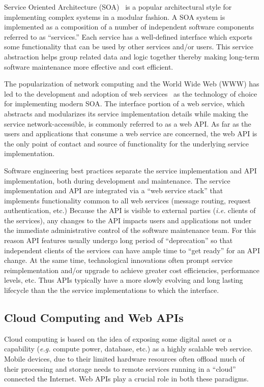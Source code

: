 Service Oriented Architecture (SOA)~\cite{XXX} is a popular architectural style for
implementing complex systems in a modular fashion. A SOA system
is implemented as a composition of a number of independent software components
referred to as ``services.'' Each service has a well-defined interface which
exports some functionality that can be used by other services and/or users.
This service abstraction helps group related data and logic together thereby
making long-term software maintenance more effective and cost efficient. 

The popularization of network computing and the World Wide Web (WWW) 
has led to the development and adoption of web services~\cite{XXXW3CXXX} as
the technology of choice for implementing modern SOA.  The
interface portion of a web service, which abstracts and modularizes
its service implementation
details while making the service network-accessible, is commonly referred to
as a web API. As far as the users and applications that consume a web service
are concerned, the web API is the only point of contact and source of
functionality for the underlying service implementation.

Software engineering best practices separate the service implementation
and API implementation, both during development and maintenance.
The service implementation and API are integrated via 
a ``web service stack'' that implements functionality common to all web
services (message routing, request authentication, etc.)
Because the API is visible to external parties ({\em i.e.} clients of the
services), any changes to the API
impacts users and applications not under the immediate administrative control
of the software maintenance team.  For this reason API features 
usually undergo long
period of ``deprecation'' so that independent clients of the services can have
ample time to ``get ready'' for an API change.  At the same time,
technological innovations often prompt service reimplementation and/or 
upgrade to
achieve greater cost efficiencies, performance levels, etc.
Thus APIs typically have a more
slowly evolving and long lasting lifecycle than the the service
implementations
to which the interface. 

\subsection{Cloud Computing and Web APIs}
Cloud computing is based on the idea of exposing some digital asset or a
capability ({\em e.g.} compute power, database, etc.) 
as a highly scalable web service.  Mobile
devices, due to their limited hardware resources often offload much of their
processing and storage needs to remote services running in a ``cloud''
connected the Internet.  Web APIs
play a crucial role in both these paradigms. 

